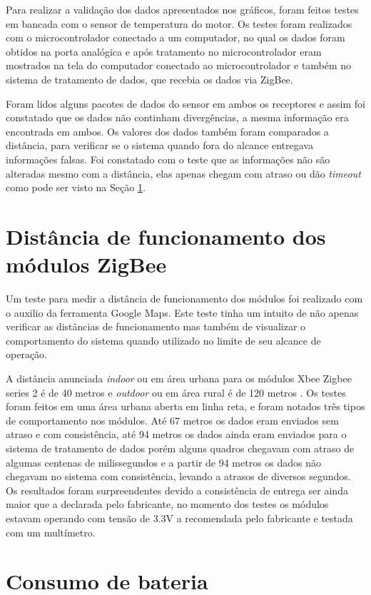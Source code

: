 Para realizar a validação dos dados apresentados nos gráficos, foram feitos testes em bancada com o sensor de temperatura do motor. Os testes foram realizados com o microcontrolador conectado a um computador, no qual os dados foram obtidos na porta analógica e após tratamento no microcontrolador eram mostrados na tela do computador conectado ao microcontrolador e também no sistema de tratamento de dados, que recebia os dados via ZigBee. 

Foram lidos alguns pacotes de dados do sensor em ambos os receptores e assim foi constatado que os dados não continham divergências, a mesma informação era encontrada em ambos. Os valores dos dados também foram comparados a distância, para verificar se o sistema quando fora do alcance entregava informações falsas. Foi constatado com o teste que as informações não são alteradas mesmo com a distância, elas apenas chegam com atraso ou dão \textit{timeout} como pode ser visto na Seção \ref{sec:distancia}.

\section{Distância de funcionamento dos módulos ZigBee}
\label{sec:distancia}

Um teste para medir a distância de funcionamento dos módulos foi realizado com o auxilio da ferramenta Google Maps. Este teste tinha um intuito de não apenas verificar as distâncias de funcionamento mas também de visualizar o comportamento do sistema quando utilizado no limite de seu alcance de operação. 

A distância anunciada \textit{indoor} ou em área urbana para os módulos Xbee Zigbee series 2 é de 40 metros e \textit{outdoor} ou em área rural é de 120 metros \cite{xbeeuserguide}. Os testes foram feitos em uma área urbana aberta em linha reta, e foram notados três tipos de comportamento nos módulos. Até 67 metros os dados eram enviados sem atraso e com consistência, até 94 metros os dados ainda eram enviados para o sistema de tratamento de dados porém alguns quadros chegavam com atraso de algumas centenas de milissegundos e a partir de 94 metros os dados não chegavam no sistema com consistência, levando a atrasos de diversos segundos. Os resultados foram surpreendentes devido a consistência de entrega ser ainda maior que a declarada pelo fabricante, no momento dos testes os módulos estavam operando com tensão de 3.3V a recomendada pelo fabricante e testada com um multímetro. 

\section{Consumo de bateria}

